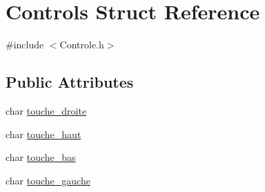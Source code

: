 \hypertarget{structControls}{\section{Controls Struct Reference}
\label{structControls}
}


{\ttfamily \#include $<$Controle.\-h$>$}

\subsection*{Public Attributes}
\begin{DoxyCompactItemize}
\item 
char \hyperlink{structControls_a43645d8ac58e05385bd29523704ef349}{touche\-\_\-droite}
\item 
char \hyperlink{structControls_a0e730725c3756dd0f89c16c3e137199e}{touche\-\_\-haut}
\item 
char \hyperlink{structControls_a2e8bc4d7a0ff80fc9d34864cf392b03b}{touche\-\_\-bas}
\item 
char \hyperlink{structControls_a3fc1d06faef4cd94d6df592bc7e06c91}{touche\-\_\-gauche}
\end{DoxyCompactItemize}


